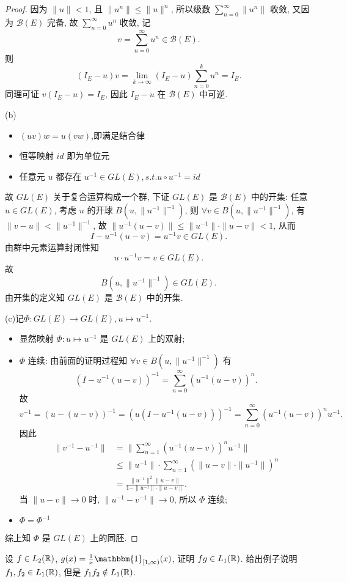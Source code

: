 \begin{proof}
因为 $\|u\|<1$, 且 $\|u^n\|\leq\|u\|^n$, 所以级数 $\sum_{n=0}^{\infty}\|u^n\|$ 收敛, 
又因为 $\mathcal{B}(E)$ 完备, 故 $\sum_{n=0}^{\infty}u^n$ 收敛, 记
\[v=\sum_{n=0}^{\infty}u^n\in\mathcal{B}(E).\]
则
\[(I_E-u)v=\lim_{k\to\infty}(I_E-u)\sum_{n=0}^ku^n=I_E.\]
同理可证 $v(I_E-u)=I_E$, 因此 $I_E-u$ 在 $\mathcal{B}(E)$ 中可逆.

(b)\begin{itemize}
\item $(uv)w=u(vw)$,即满足结合律
\item 恒等映射 $id$ 即为单位元
\item 任意元 $u$ 都存在 $u^{-1}\in GL(E),s.t.u\circ u^{-1}=id$
\end{itemize}
故 $GL(E)$ 关于复合运算构成一个群, 
下证 $GL(E)$ 是 $\mathcal{B}(E)$ 中的开集: 
任意 $u\in GL(E)$, 考虑 $u$ 的开球 $B(u,\|u^{-1}\|^{-1})$, 
则 $\forall v\in B(u,\|u^{-1}\|^{-1})$, 有 $\|v-u\|<\|u^{-1}\|^{-1}$, 
故 $\|u^{-1}(u-v)\|\leq \|u^{-1}\|\cdot\|u-v\|<1$, 从而
\[I-u^{-1}(u-v)=u^{-1}v\in GL(E).\]
由群中元素运算封闭性知
\[u\cdot u^{-1}v=v\in GL(E).\]
故
\[B(u,\|u^{-1}\|^{-1})\in GL(E).\]
由开集的定义知 $GL(E)$ 是 $\mathcal{B}(E)$ 中的开集.

(c)记$\Phi:GL(E)\to GL(E),u\mapsto u^{-1}$.
\begin{itemize}
\item 显然映射 $\Phi:u\mapsto u^{-1}$ 是 $GL(E)$ 上的双射;
\item $\Phi$ 连续: 由前面的证明过程知 $\forall v\in B(u,\|u^{-1}\|^{-1})$ 有
\[(I-u^{-1}(u-v))^{-1}=\sum_{n=0}^{\infty}(u^{-1}(u-v))^n.\]
故
\[v^{-1}=(u-(u-v))^{-1}=(u(I-u^{-1}(u-v)))^{-1}=\sum_{n=0}^{\infty}(u^{-1}(u-v))^nu^{-1}.\]
因此
\[\begin{split}
\|v^{-1}-u^{-1}\|
&=\|\sum_{n=1}^{\infty}(u^{-1}(u-v))^nu^{-1}\|\\
&\leq\|u^{-1}\|\cdot\sum_{n=1}^{\infty}(\|u-v\|\cdot\|u^{-1}\|)^n\\
&=\frac{\|u^{-1}\|^2\|u-v\|}{1-\|u^{-1}\|\cdot\|u-v\|}.
\end{split}\]
当 $\|u-v\|\to 0$ 时, $\|u^{-1}-v^{-1}\|\to 0$, 所以 $\Phi$ 连续;
\item $\Phi=\Phi^{-1}$
\end{itemize}
综上知 $\Phi$ 是 $GL(E)$ 上的同胚.
\end{proof}



\begin{exercise}
    设 $f\in L_2(\mathbb{R})$, $g(x)=\frac{1}{x}\mathbbm{1}_{[1,\infty)}(x)$, 
    证明 $fg\in L_1(\mathbb{R})$. 给出例子说明 $f_1,f_2\in L_1(\mathbb{R})$, 但是 $f_1f_2\notin L_1(\mathbb{R})$.
\end{exercise}

